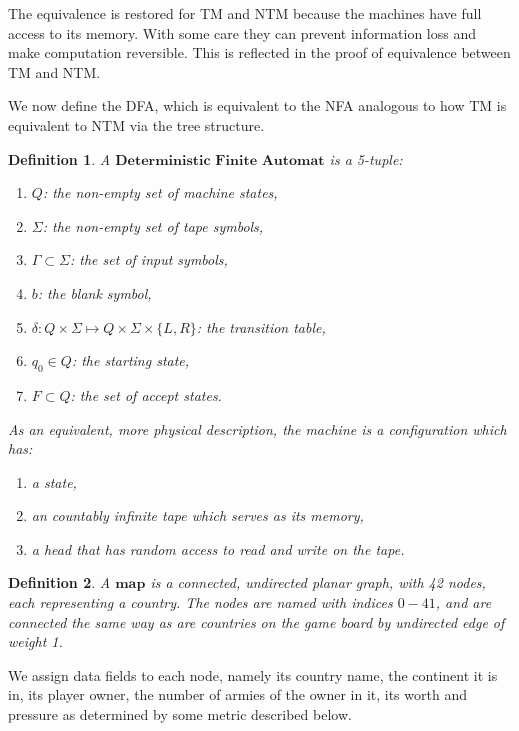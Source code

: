 \documentclass[12pt]{article}  %
\newtheorem{definition}{Definition}
\begin{document}
The equivalence is restored for TM and NTM because the machines have full access to its memory. With some care they can prevent information loss and make computation reversible. This is reflected in the proof of equivalence between TM and NTM.

We now define the DFA, which is equivalent to the NFA analogous to how TM is equivalent to NTM via the tree structure.

\begin{definition}
A $\textbf{Deterministic Finite Automat}$ is a 5-tuple:
\begin{enumerate}
	\item $Q$: the non-empty set of machine states,
	\item $\Sigma$: the non-empty set of tape symbols,
	\item $\Gamma \subset \Sigma$: the set of input symbols,
	\item $b$: the blank symbol,
	\item $\delta: Q \times \Sigma \mapsto Q \times \Sigma \times \{L, R\} $: the transition table,
	\item $q_0 \in Q$: the starting state,
	\item $F \subset Q$: the set of accept states.
\end{enumerate}

As an equivalent, more physical description, the machine is a configuration which has:
\begin{enumerate}
	\item a state,
	\item an countably infinite tape which serves as its memory,
	\item a head that has random access to read and write on the tape.
\end{enumerate}
\end{definition}



\begin{definition} \label{map}
A $\textbf{map}$ is a connected, undirected planar graph, with 42 nodes, each representing a country. The nodes are named with indices $0-41$, and are connected the same way as are countries on the game board by undirected edge of weight 1.
\end{definition}

We assign data fields to each node, namely its country name, the continent it is in, its player owner, the number of armies of the owner in it, its worth and pressure as determined by some metric described below.
\end{document}
